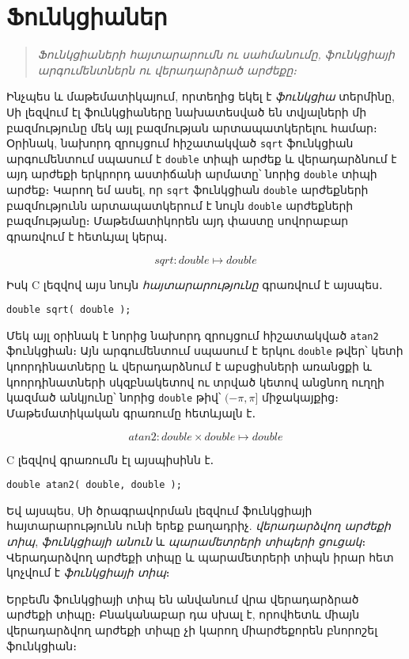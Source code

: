 \chapter{Ֆունկցիաներ}

\begin{quote}
\emph{Ֆունկցիաների հայտարարումն ու սահմանումը, ֆունկցիայի արգումենտներն
ու վերադարձրած արժեքը։}
\end{quote}

Ինչպես և մաթեմատիկայում, որտեղից եկել է \emph{ֆունկցիա} տերմինը, Սի լեզվում
էլ ֆունկցիաները նախատեսված են տվյալների մի բազմությունը մեկ այլ բազմության
արտապատկերելու համար։ Օրինակ, նախորդ զրույցում հիշատակված \texttt{sqrt}
ֆունկցիան արգումենտում սպասում է \texttt{double} տիպի արժեք և վերադարձնում է
այդ արժեքի երկրորդ աստիճանի արմատը՝ նորից \texttt{double} տիպի արժեք։ Կարող
եմ ասել, որ \texttt{sqrt} ֆունկցիան \texttt{double} արժեքների բազմությունն
արտապատկերում է նույն \texttt{double} արժեքների բազմությանը։ Մաթեմատիկորեն
այդ փաստը սովորաբար գրառվում է հետևյալ կերպ․

\[
sqrt : double \mapsto double
\]

Իսկ C լեզվով այս նույն \emph{հայտարարությունը} գրառվում է այսպես․

\begin{verbatim}
double sqrt( double );
\end{verbatim}

Մեկ այլ օրինակ է նորից նախորդ զրույցում հիշատակված \texttt{atan2} ֆունկցիան։
Այն արգումենտում սպասում է երկու \texttt{double} թվեր՝ կետի կոորդինատները և
վերադարձնում է աբսցիսների առանցքի և կոորդինատների սկզբնակետով ու տրված կետով
անցնող ուղղի կազմած անկյունը՝ նորից \texttt{double} թիվ՝ \((−\pi, \pi]\)
միջակայքից։ Մաթեմատիկական գրառումը հետևյալն է․

\[
atan2 : double \times double \mapsto double
\]

C լեզվով գրառումն էլ այսպիսինն է․

\begin{verbatim}
double atan2( double, double );
\end{verbatim}

Եվ այսպես, Սի ծրագրավորման լեզվում ֆունկցիայի հայտարարությունն ունի երեք
բաղադրիչ. \emph{վերադարձվող արժեքի տիպ}, \emph{ֆունկցիայի անուն} և
\emph{պարամետրերի տիպերի ցուցակ}։ Վերադարձվող արժեքի տիպը և պարամետրերի տիպն
իրար հետ կոչվում է \emph{ֆունկցիայի տիպ}։

Երբեմն ֆունկցիայի տիպ են անվանում վրա վերադարձրած արժեքի տիպը։ Բնականաբար
դա սխալ է, որովհետև միայն վերադարձվող արժեքի տիպը չի կարող միարժեքորեն
բնորոշել ֆունկցիան։

